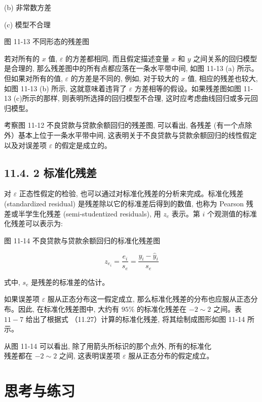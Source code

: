 \documentclass[10pt]{article}
\begin{document}
\begin{CJK*}{UTF8}{bsmi}
(b) 非常数方差

\begin{center}
\end{center}

(c) 模型不合理

图 11-13 不同形态的残差图

若对所有的 $x$ 值, $\varepsilon$ 的方差都相同, 而且假定描述变量 $x$ 和 $y$ 之间关系的回归模型是合理的, 那么残差图中的所有点都应落在一条水平带中间, 如图 11-13 (a) 所示。但如果对所有的值, $\varepsilon$ 的方差是不同的, 例如, 对于较大的 $x$ 值, 相应的残差也较大, 如图 11-13 (b) 所示, 这就意味着违背了 $\varepsilon$ 方差相等的假设。如果残差图如图 11-13 (c)所示的那样, 则表明所选择的回归模型不合理, 这时应考虑曲线回归或多元回归模型。

考察图 11-12 不良贷款与贷款余额回归的残差图, 可以看出, 各残差 (有一个点除外）基本上位于一条水平带中间, 这表明关于不良贷款与贷款余额回归的线性假定以及对误差项 $\varepsilon$ 的假定是成立的。

\subsection*{11.4. 2 标准化残差}
对 $\varepsilon$ 正态性假定的检验, 也可以通过对标准化残差的分析来完成。标准化残差 (standardized residual) 是残差除以它的标准差后得到的数值, 也称为 Pearson 残差或半学生化残差 (semi-studentized residuals), 用 $z_{e}$ 表示。第 $i$ 个观测值的标准化残差可以表示为:

\begin{center}
\end{center}

图 11-14 不良贷款与贷款余额回归的标准化残差图


\begin{equation*}
z_{e_{i}}=\frac{e_{i}}{s_{e}}=\frac{y_{i}-\hat{y}_{i}}{s_{e}} \tag{11.27}
\end{equation*}


式中, $s_{e}$ 是残差的标准差的估计。

如果误差项 $\varepsilon$ 服从正态分布这一假定成立, 那么标准化残差的分布也应服从正态分布。因此, 在标准化残差图中, 大约有 $95 \%$ 的标准化残差在 $-2 \sim 2$ 之间。表 $11-7$ 给出了根据式 （11.27）计算的标准化残差, 将其绘制成图形如图 11-14 所示。

从图 11-14 可以看出, 除了用箭头所标识的那个点外, 所有的标准化\\
残差都在 $-2 \sim 2$ 之间, 这表明误差项 $\varepsilon$ 服从正态分布的假定成立。

\section*{思考与练习}

\end{CJK*}
\end{document}
